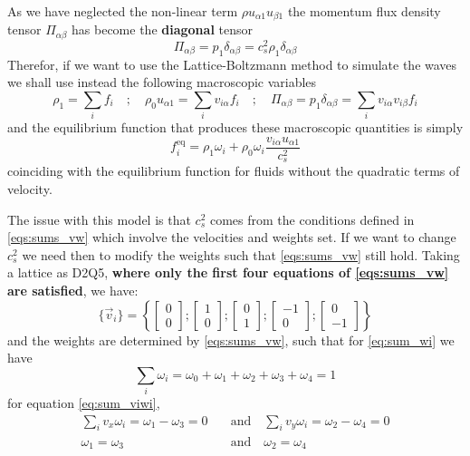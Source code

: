 As we have neglected the non-linear term $\rho u_{\alpha1}u_{\beta1}$ the momentum flux density tensor $\Pi_{\alpha\beta}$ has become the \textbf{diagonal} tensor
\begin{equation}
    \Pi_{\alpha\beta} = p_1\delta_{\alpha\beta} = c_s^2\rho_1\delta_{\alpha\beta}
\end{equation}
Therefor, if we want to use the Lattice-Boltzmann method to simulate the waves we shall use instead the following macroscopic variables
\begin{equation}
    \rho_1 = \sum_i f_i \quad;\quad \rho_0 u_{\alpha1} = \sum_i v_{i\alpha}f_i  \quad;\quad \Pi_{\alpha\beta} = p_1\delta_{\alpha\beta} = \sum_i v_{i\alpha}v_{i\beta}f_i
\end{equation}
and the equilibrium function that produces these macroscopic quantities is simply
\begin{equation}\label{eq:eq_function_waves_from_fluids}
    f_i^{\text{eq}} = \rho_1\omega_i + \rho_0\omega_i\frac{v_{i\alpha}u_{\alpha1}}{c_s^2}
\end{equation}
coinciding with the equilibrium function for fluids without the quadratic terms of velocity. 

The issue with this model is that $c_s^2$ comes from the conditions defined in \ref{eqs:sums_vw} which involve the velocities and weights set. If we want to change $c_s^2$ we need then to modify the weights such that \ref{eqs:sums_vw} still hold. Taking a lattice as D2Q5, \textbf{where only the first four equations of \ref{eqs:sums_vw} are satisfied}, we have:
\begin{equation}
    \{\vec v_i\} = \left\{\begin{bmatrix}
        0 \\
        0
    \end{bmatrix};\begin{bmatrix}
        1 \\
        0
    \end{bmatrix};\begin{bmatrix}
        0 \\
        1
    \end{bmatrix};\begin{bmatrix}
        -1 \\
        0
    \end{bmatrix};\begin{bmatrix}
        0 \\
        -1
    \end{bmatrix}\right\}
\end{equation}
and the weights are determined by \ref{eqs:sums_vw}, such that for \ref{eq:sum_wi} we have
\begin{equation}\label{eq:weights_first}
    \sum_i \omega_i = \omega_0 + \omega_1 + \omega_2 + \omega_3 + \omega_4 = 1
\end{equation}
for equation \ref{eq:sum_viwi},
\begin{align}
    \sum_i v_{x}\omega_i = \omega_1 - \omega_3 = 0\quad&\text{and}\quad\sum_i v_{y}\omega_i = \omega_2 - \omega_4 = 0 \nonumber\\
    \omega_1 = \omega_3\quad&\text{and}\quad\omega_2 = \omega_4 \label{eq:weights_second}
\end{align}

